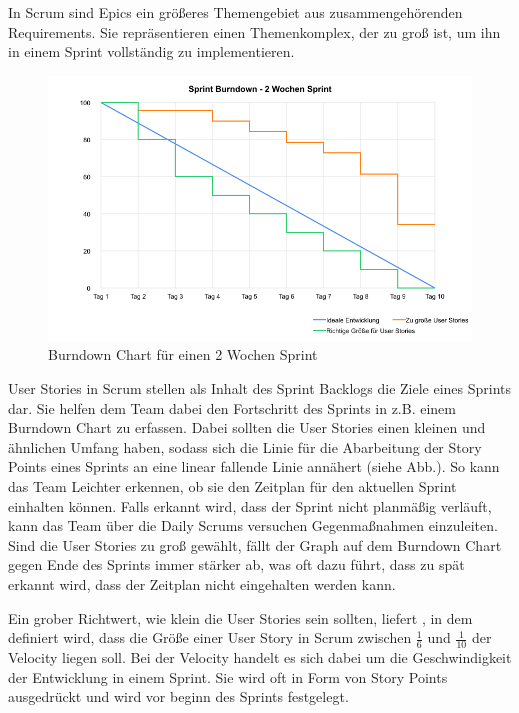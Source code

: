 \documentclass[acmtog]{acmart}
\begin{document}
In Scrum sind Epics ein größeres Themengebiet aus zusammengehörenden Requirements. Sie repräsentieren einen Themenkomplex, der 
zu groß ist, um ihn in einem Sprint vollständig zu implementieren. \cite{reinscrum}

\begin{figure}[t]
  \centering
  \includegraphics[width=\linewidth]{images/sprint-burndown2.png}
  \caption{Burndown Chart für einen 2 Wochen Sprint}
    \label{fig:burndownchart}
  \Description{}
\end{figure}

User Stories in Scrum stellen als Inhalt des Sprint Backlogs die Ziele eines Sprints dar. Sie helfen dem Team dabei den Fortschritt 
des Sprints in z.B. einem Burndown Chart zu erfassen. Dabei sollten die User Stories einen kleinen und ähnlichen Umfang haben, sodass 
sich die Linie für die Abarbeitung der Story Points eines Sprints an eine linear fallende Linie annähert (siehe Abb.). So kann das 
Team Leichter erkennen, ob sie den Zeitplan für den aktuellen Sprint einhalten können. Falls erkannt wird, dass der Sprint nicht planmäßig 
verläuft, kann das Team über die Daily Scrums versuchen Gegenmaßnahmen einzuleiten. Sind die User Stories zu groß gewählt, fällt der 
Graph auf dem Burndown Chart gegen Ende des Sprints immer stärker ab, was oft dazu führt, dass zu spät erkannt wird, dass der Zeitplan 
nicht eingehalten werden kann. \cite{reinscrum} 

Ein grober Richtwert, wie klein die User Stories sein sollten, liefert \cite{humanizingwork}, 
in dem definiert wird, dass die Größe einer User Story in Scrum zwischen \( \frac{1}{6} \) und \( \frac{1}{10} \) der Velocity liegen soll. Bei der Velocity handelt 
es sich dabei um die Geschwindigkeit der Entwicklung in einem Sprint. Sie wird oft in Form von Story Points ausgedrückt und wird vor 
beginn des Sprints festgelegt. \cite{humanizingwork}
\end{document}
